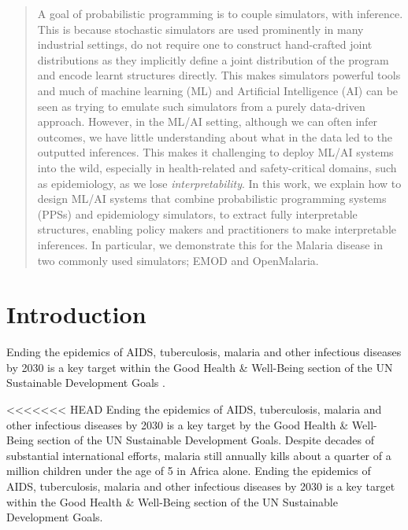 \documentclass{article}
\begin{document}
\printAffiliationsAndNotice{\icmlEqualContribution} %

\begin{abstract}

A goal of probabilistic programming is to couple simulators, with inference. This is 
because stochastic simulators are used prominently in many industrial settings,
do not require one to construct hand-crafted joint distributions as they implicitly 
define a joint distribution of the program and encode learnt structures 
directly. This makes simulators powerful tools and much of machine learning (ML) and 
Artificial Intelligence (AI)
can be seen as trying to emulate such simulators from a purely data-driven approach.
However, in the 
ML/AI setting, although we can often infer outcomes, we have little understanding about what 
in the data led to the outputted inferences. 
This makes it challenging to deploy ML/AI systems into the wild, especially in health-related and safety-critical domains, such
as epidemiology, as we lose \emph{interpretability}. 
In this work, we explain how to design ML/AI systems that combine
probabilistic programming systems (PPSs) and epidemiology simulators, to extract
fully interpretable structures, enabling policy makers 
and practitioners to make interpretable inferences. 
In particular, we demonstrate this for the Malaria disease in two commonly used simulators; EMOD and OpenMalaria.
\end{abstract}

\section{Introduction}
Ending the epidemics of AIDS, tuberculosis, malaria and other infectious diseases by 2030 is a key target within the Good Health \& Well-Being section of the UN Sustainable Development Goals \cite{refugees_2030_nodate}\cite{un_sustainable_2018}. 

<<<<<<< HEAD
Ending the epidemics of AIDS, tuberculosis, malaria and other infectious diseases by 2030 is a key target by the Good Health \& Well-Being section of the UN Sustainable Development Goals. 
Despite decades of substantial international efforts, malaria still annually kills about a quarter of a million children under the age of 5 in Africa alone.
Ending the epidemics of AIDS, tuberculosis, malaria and other infectious diseases by 2030 is a key target within the Good Health \& Well-Being section of the UN Sustainable Development Goals\cite{}. 
\end{document}
